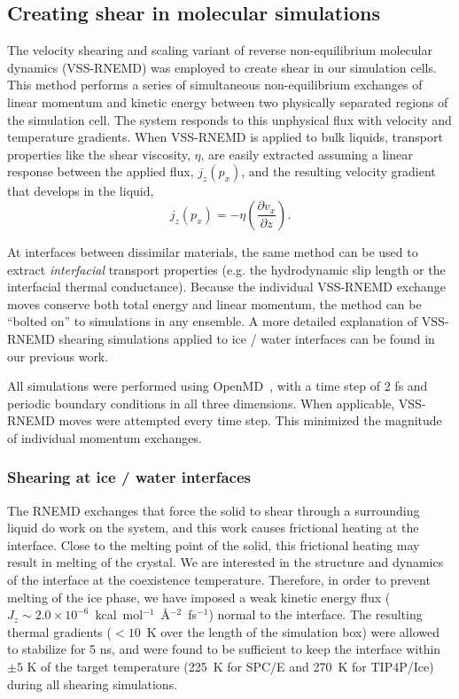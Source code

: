 \subsection{Creating shear in molecular simulations}
The velocity shearing and scaling variant of reverse non-equilibrium
molecular dynamics (VSS-RNEMD)\cite{Kuang2012} was employed to create
shear in our simulation cells. This method performs a series of
simultaneous non-equilibrium exchanges of linear momentum and kinetic
energy between two physically separated regions of the simulation
cell. The system responds to this unphysical flux with velocity and
temperature gradients. When VSS-RNEMD is applied to bulk liquids,
transport properties like the shear viscosity, $\eta$, are easily
extracted assuming a linear response between the applied flux,
$j_z(p_x)$, and the resulting velocity gradient that develops in the
liquid,\cite{Bordat2002a}
\begin{equation}
\label{eq:viscosity}
j_z(p_x) = -\eta \left(\frac{\partial v_x}{\partial z}\right).
\end{equation}

At interfaces between dissimilar materials, the same method can be
used to extract \textit{interfacial} transport properties (e.g. the
hydrodynamic slip length or the interfacial thermal
conductance). Because the individual VSS-RNEMD exchange moves conserve
both total energy and linear momentum, the method can be ``bolted on''
to simulations in any ensemble.  A more detailed explanation of
VSS-RNEMD shearing simulations applied to ice / water interfaces can
be found in our previous work.\cite{Louden2013a}

All simulations were performed using
OpenMD~\cite{Meineke2005,Gezelter2016}, with a time step of 2 fs and
periodic boundary conditions in all three dimensions. When applicable,
VSS-RNEMD moves were attempted every time step. This minimized the
magnitude of individual momentum exchanges. 

\subsubsection{Shearing at ice / water interfaces}
The RNEMD exchanges that force the solid to shear through a
surrounding liquid do work on the system, and this work causes
frictional heating at the interface. Close to the melting point of the
solid, this frictional heating may result in melting of the crystal.
We are interested in the structure and dynamics of the interface at
the coexistence temperature.  Therefore, in order to prevent melting
of the ice phase, we have imposed a weak kinetic energy flux
($J_z \sim 2.0\times 10^{-6}$~kcal~mol$^{-1}$~\AA$^{-2}$~fs$^{-1}$)
normal to the interface. The resulting thermal gradients ($< 10$~K
over the length of the simulation box) were allowed to stabilize for 5
ns, and were found to be sufficient to keep the interface within
$\pm 5$ K of the target temperature (225~K for SPC/E and 270~K for
TIP4P/Ice) during all shearing simulations.
 
